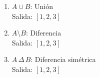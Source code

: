 \begin{itemize}
\begin{enumerate}
        \item \( A \cup B \): Unión\\
        Salida: \([1, 2, 3]\)

        \item \( A \setminus B \): Diferencia\\
        Salida: \([1, 2, 3]\)

        \item \( A \, \Delta \, B \): Diferencia simétrica\\
        Salida: \([1, 2, 3]\)
    \end{enumerate}
\end{itemize}